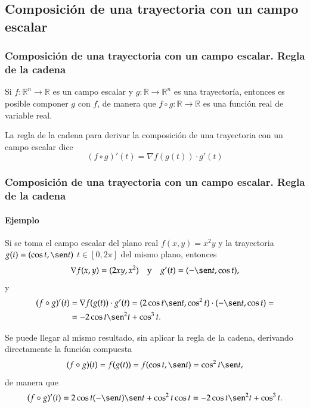 \subsection{Composición de una trayectoria con un campo escalar}
\begin{frame}
	\frametitle{Composición de una trayectoria con un campo escalar. Regla de la cadena}
	Si $f:\mathbb{R}^n\rightarrow \mathbb{R}$ es un campo escalar y $g:\mathbb{R}\rightarrow \mathbb{R}^n$ es una
	trayectoría, entonces es posible componer $g$ con $f$, de manera que $f\circ g:\mathbb{R}\rightarrow \mathbb{R}$ es una
	función real de variable real.
	
	La regla de la cadena para derivar la composición de una trayectoria con un campo escalar dice 
	\[
		(f\circ g)'(t) = \nabla f(g(t))\cdot g'(t) 
	\]  
\end{frame}


\begin{frame}
	\frametitle{Composición de una trayectoria con un campo escalar. Regla de la cadena}
	\framesubtitle{Ejemplo}
	Si se toma el campo escalar del plano real $f(x,y)=x^2y$ y la trayectoria $g(t)=(\cos t,\sen t)$ $t\in [0,2\pi]$ del mismo plano, entonces
	\[
		\nabla f(x,y) = (2xy, x^2) \quad  \mbox{y} \quad g'(t) = (-\sen t, \cos t),
	\]
	y 
	\begin{align*}
		(f\circ g)'(t) & = \nabla f(g(t))\cdot g'(t) = (2\cos t\sen t,\cos^2 t)\cdot (-\sen t,\cos t) = \\
		               & = -2\cos t\sen^2 t+\cos^3 t.                                                   
	\end{align*}
	
	Se puede llegar al mismo resultado, sin aplicar la regla de la cadena, derivando directamente la función compuesta
	\[
		(f\circ g)(t) = f(g(t)) = f(\cos t, \sen t) = \cos^2 t\sen t,
	\]
	de manera que
	\[
		(f\circ g)'(t) = 2\cos t(-\sen t)\sen t+\cos^2 t \cos t = -2\cos t\sen^2 t+\cos^3 t.
	\]
\end{frame}


